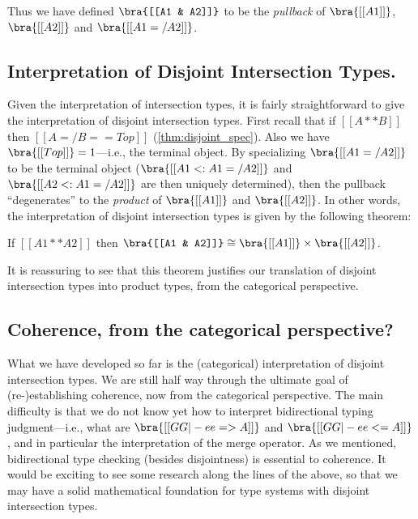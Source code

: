 Thus we have defined $\bra{[[A1 & A2]]}$ to be the \textit{pullback} of
$\bra{[[A1]]}$, $\bra{[[A2]]}$ and $\bra{[[A1 =/ A2]]}$.

\subsection{Interpretation of Disjoint Intersection Types.}

Given the interpretation of intersection types, it is fairly straightforward to
give the interpretation of disjoint intersection types. First recall that if
$[[A ** B]]$ then $[[ A =/ B == Top ]]$ (\cref{thm:disjoint_spec}). Also we have
$\bra{[[Top]]} = 1$---i.e., the terminal object. By specializing $\bra{[[A1 =/ A2]]}$ to be the terminal object
($\bra{[[A1 <: A1 =/ A2]]}$ and $\bra{[[A2 <: A1 =/ A2]]}$ are then uniquely
determined), then the pullback ``degenerates'' to the \textit{product} of
$\bra{[[A1]]}$ and $\bra{[[A2]]}$. In other words, the interpretation of
disjoint intersection types is given by the following theorem:
\begin{theorem}
  If $[[A1 ** A2]]$ then $\bra{[[A1 & A2]]} \cong \bra{[[A1]]} \times \bra{[[A2]]} $.
\end{theorem}
\begin{remark}
It is reassuring to see that this theorem justifies our translation of
disjoint intersection types into product types, from the categorical
perspective.
\end{remark}



\subsection{Coherence, from the categorical perspective?}

What we have developed so far is the (categorical) interpretation of disjoint intersection
types. We are still half way through the ultimate goal of (re-)establishing
coherence, now from the categorical perspective. The main difficulty is that we
do not know yet how to interpret bidirectional typing judgment---i.e., what are
$\bra{[[GG |- ee => A]]}$ and $\bra{[[GG |- ee <= A]]}$, and in particular the
interpretation of the merge operator. As we mentioned, bidirectional type checking
(besides disjointness) is essential to coherence. It would be exciting to see
some research along the lines of the above, so that we may have a solid
mathematical foundation for type systems with disjoint intersection types.

